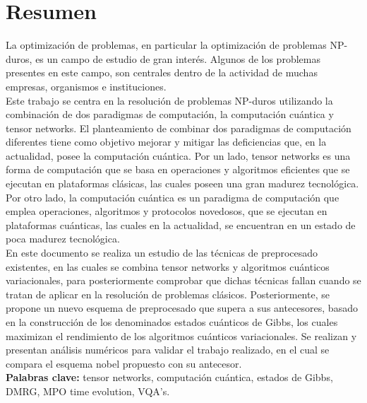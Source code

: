 \chapter{Resumen}

La optimización de problemas, en particular la optimización de problemas NP-duros, es un campo de estudio de gran interés. Algunos de los problemas presentes en este campo, son centrales dentro de la actividad de muchas empresas, organismos e instituciones. \\

Este trabajo se centra en la resolución de problemas NP-duros utilizando la combinación de dos paradigmas de computación, la computación cuántica y tensor networks. El planteamiento de combinar dos paradigmas de computación diferentes tiene como objetivo mejorar y mitigar las deficiencias que, en la actualidad, posee la computación cuántica. Por un lado, tensor networks es una forma de computación que se basa en operaciones y algoritmos eficientes que se ejecutan en plataformas clásicas, las cuales poseen una gran madurez tecnológica. Por otro lado, la computación cuántica es un paradigma de computación que emplea operaciones, algoritmos y protocolos novedosos, que se ejecutan en plataformas cuánticas, las cuales en la actualidad, se encuentran en un estado de poca madurez tecnológica. \\

En este documento se realiza un estudio de las técnicas de preprocesado existentes, en las cuales se combina tensor networks y algoritmos cuánticos variacionales, para posteriormente comprobar que dichas técnicas fallan cuando se tratan de aplicar en la resolución de problemas clásicos. Posteriormente, se propone un nuevo esquema de preprocesado que supera a sus antecesores, basado en la construcción de los denominados estados cuánticos de Gibbs, los cuales maximizan el rendimiento de los algoritmos cuánticos variacionales. Se realizan y presentan análisis numéricos para validar el trabajo realizado, en el cual se compara el esquema nobel propuesto con su antecesor. \\

{\bf Palabras clave:} tensor networks, computación  cuántica, estados de Gibbs, DMRG, MPO time evolution, VQA's.